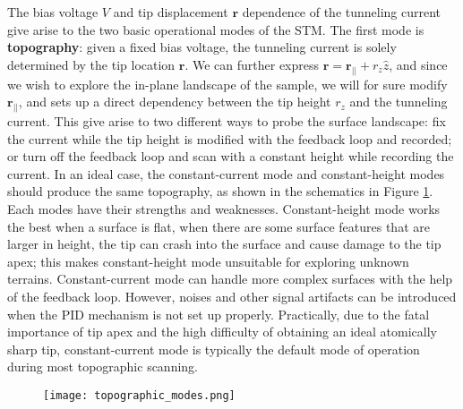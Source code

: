 The bias voltage $V$ and tip displacement $\mathbf{r}$ dependence of the tunneling current give arise to the two basic operational modes of the \ac{STM}. The first mode is \textbf{topography}: given a fixed bias voltage, the tunneling current is solely determined by the tip location $\mathbf{r}$. We can further express $\mathbf{r} = \mathbf{r_{||}} + r_z \hat{z}$, and since we wish to explore the in-plane landscape of the sample, we will for sure modify $\mathbf{r_{||}}$, and sets up a direct dependency between the tip height $r_z$ and the tunneling current. This give arise to two different ways to probe the surface landscape: fix the current while the tip height is modified with the feedback loop and recorded; or turn off the feedback loop and scan with a constant height while recording the current. In an ideal case, the constant-current mode and constant-height modes should produce the same topography, as shown in the schematics in Figure \ref{fig:topo_modes}. Each modes have their strengths and weaknesses. Constant-height mode works the best when a surface is flat, when there are some surface features that are larger in height, the tip can crash into the surface and cause damage to the tip apex; this makes constant-height mode unsuitable for exploring unknown terrains. Constant-current mode can handle more complex surfaces with the help of the feedback loop. However, noises and other signal artifacts can be introduced when the PID mechanism is not set up properly. Practically, due to the fatal importance of tip apex and the high difficulty of obtaining an ideal atomically sharp tip, constant-current mode is typically the default mode of operation during most topographic scanning. 

\begin{figure}
	\centering
	\texttt{[image: topographic\_modes.png]}
	\caption{}
	\label{fig:topo_modes}
\end{figure}

